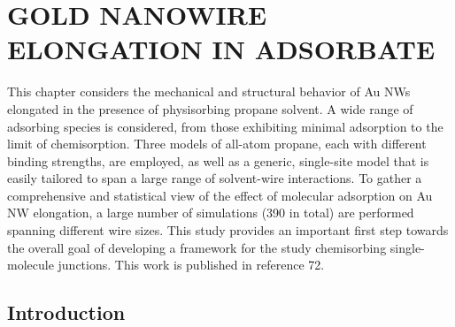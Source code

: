 \documentclass[10pt]{report}  %
\newcommand\findent{\hspace*{\parindent}}
\begin{document}
%
%
%
%
\chapter{GOLD NANOWIRE ELONGATION IN ADSORBATE}

\findent This chapter considers the mechanical and structural behavior of Au NWs elongated in the presence of physisorbing propane solvent. A wide range of adsorbing species is considered, from those exhibiting minimal adsorption to the limit of chemisorption. Three models of all-atom propane, each with different binding strengths, are employed, as well as a generic, single-site model that is easily tailored to span a large range of solvent-wire interactions. To gather a comprehensive and statistical view of the effect of molecular adsorption on Au NW elongation, a large number of simulations (390 in total) are performed spanning different wire sizes. This study provides an important first step towards the overall goal of developing a framework for the study chemisorbing single-molecule junctions. This work is published in reference 72.

\section{Introduction}
\end{document}

